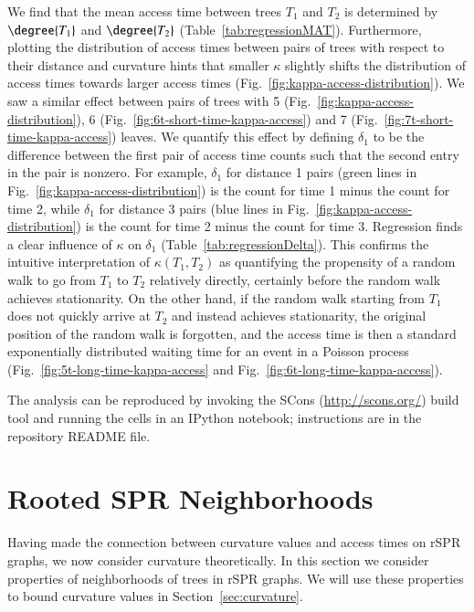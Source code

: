 \documentclass[]{elsarticle}
\begin{document}
We find that the mean access time between trees $T_1$ and $T_2$ is determined by $\degree{T_1}$ and $\degree{T_2}$ (Table~\ref{tab:regressionMAT}).
Furthermore, plotting the distribution of access times between pairs of trees with respect to their distance and curvature hints that smaller $\kappa$ slightly shifts the distribution of access times towards larger access times (Fig.~\ref{fig:kappa-access-distribution}).
We saw a similar effect between pairs of trees with 5 (Fig.~\ref{fig:kappa-access-distribution}), 6 (Fig.~\ref{fig:6t-short-time-kappa-access}) and 7 (Fig.~\ref{fig:7t-short-time-kappa-access}) leaves.
We quantify this effect by defining $\delta_1$ to be the difference between the first pair of access time counts such that the second entry in the pair is nonzero.
For example, $\delta_1$ for distance 1 pairs (green lines in Fig.~\ref{fig:kappa-access-distribution}) is the count for time 1 minus the count for time 2, while $\delta_1$ for distance 3 pairs (blue lines in Fig.~\ref{fig:kappa-access-distribution}) is the count for time 2 minus the count for time 3.
Regression finds a clear influence of $\kappa$ on $\delta_1$ (Table~\ref{tab:regressionDelta}).
This confirms the intuitive interpretation of $\kappa(T_1, T_2)$ as quantifying the propensity of a random walk to go from $T_1$ to $T_2$ relatively directly, certainly before the random walk achieves stationarity.
On the other hand, if the random walk starting from $T_1$ does not quickly arrive at $T_2$ and instead achieves stationarity, the original position of the random walk is forgotten, and the access time is then a standard exponentially distributed waiting time for an event in a Poisson process (Fig.~\ref{fig:5t-long-time-kappa-access} and Fig.~\ref{fig:6t-long-time-kappa-access}).



The analysis can be reproduced by invoking the SCons (\url{http://scons.org/}) build tool and running the cells in an IPython notebook; instructions are in the repository README file.


\section{Rooted SPR Neighborhoods}
\label{sec:neighborhoods}
Having made the connection between curvature values and access times on rSPR graphs, we now consider curvature theoretically.
In this section we consider properties of neighborhoods of trees in rSPR graphs.
We will use these properties to bound curvature values in Section~\ref{sec:curvature}.
\end{document}
